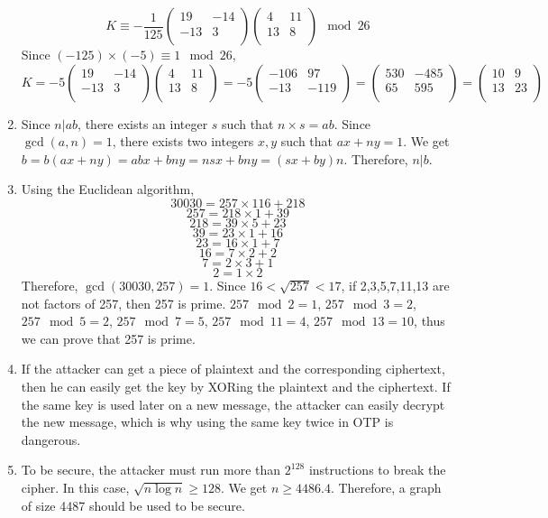 \documentclass[a4paper]{article}
\begin{document}
\begin{enumerate}
    $$K
    \equiv
    -\frac{1}{125}
    \left(
    \begin{array}{ccc}
    19 & -14\\
    -13 & 3\\
    \end{array}
    \right)
    \left(
    \begin{array}{ccc}
    4 & 11\\
    13 & 8\\
    \end{array}
    \right)
    \mod
    26
    $$
    Since $(-125)\times(-5)\equiv1\mod26$,
    $$
    K=-5\left(
    \begin{array}{ccc}
    19 & -14\\
    -13 & 3\\
    \end{array}
    \right)
    \left(
    \begin{array}{ccc}
    4 & 11\\
    13 & 8\\
    \end{array}
    \right)
    =
    -5\left(
    \begin{array}{ccc}
    -106 & 97\\
    -13 & -119\\
    \end{array}
    \right)
    =
    \left(
    \begin{array}{ccc}
    530 & -485\\
    65 & 595\\
    \end{array}
    \right)
    =
    \left(
    \begin{array}{ccc}
    10 & 9\\
    13 & 23\\
    \end{array}
    \right)
    $$
\item
Since $n|ab$, there exists an integer $s$ such that $n\times s=ab$. Since $\gcd(a,n)=1$, there exists two integers $x,y$ such that $ax+ny=1$. We get $b=b(ax+ny)=abx+bny=nsx+bny=(sx+by)n$. Therefore, $n|b$.
\item
Using the Euclidean algorithm,
$$30030=257\times116+218$$
$$257=218\times1+39$$
$$218=39\times5+23$$
$$39=23\times1+16$$
$$23=16\times1+7$$
$$16=7\times2+2$$
$$7=2\times3+1$$
$$2=1\times2$$
Therefore, $\gcd(30030,257)=1$.
Since $16<\sqrt{257}<17$, if 2,3,5,7,11,13 are not factors of 257, then 257 is prime. $257\mod2=1$, $257\mod3=2$, $257\mod5=2$, $257\mod7=5$, $257\mod11=4$, $257\mod13=10$, thus we can prove that 257 is prime.
\item
If the attacker can get a piece of plaintext and the corresponding ciphertext, then he can easily get the key by XORing the plaintext and the ciphertext. If the same key is used later on a new message, the attacker can easily decrypt the new message, which is why using the same key twice in OTP is dangerous.
\item
To be secure, the attacker must run more than $2^{128}$ instructions to break the cipher. In this case, $\sqrt{n\log n}\geqslant128$. We get $n\geqslant4486.4$. Therefore, a graph of size 4487 should be used to be secure.


\end{enumerate}
\end{document}
